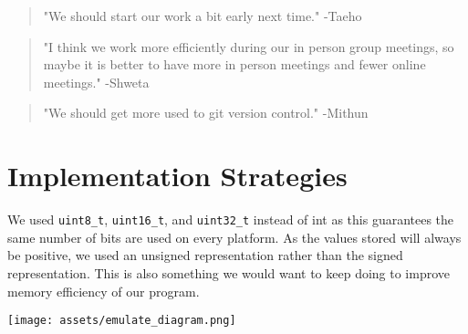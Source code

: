 \documentclass[11pt]{article}
\begin{document}
\begin{quote}
  "We should start our work a bit early next time." -Taeho
\end{quote}
\begin{quote}
  "I think we work more efficiently during our in person group meetings, so maybe it is better to have more in person meetings and fewer online meetings." -Shweta
\end{quote}
\begin{quote}
  "We should get more used to git version control." -Mithun
\end{quote}


\section{Implementation Strategies}

We used \texttt{uint8\_t}, \texttt{uint16\_t}, and \texttt{uint32\_t} instead of int as this guarantees the same number of bits are used on every platform. As the values stored will always be positive, we used an unsigned representation rather than the signed representation. This is also something we would want to keep doing to improve memory efficiency of our program. 

\begin{center}
    \texttt{[image: assets/emulate\_diagram.png]}
\end{center}
\end{document}
